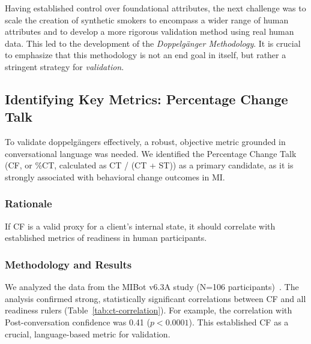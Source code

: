 Having established control over foundational attributes, the next challenge was to scale the creation of synthetic smokers to encompass a wider range of human attributes and to develop a more rigorous validation method using real human data. This led to the development of the \textit{Doppelgänger Methodology}. It is crucial to emphasize that this methodology is not an end goal in itself, but rather a stringent strategy for \textit{validation}.

\subsection{Identifying Key Metrics: Percentage Change Talk}

To validate doppelgängers effectively, a robust, objective metric grounded in conversational language was needed. We identified the Percentage Change Talk (CF, or \%CT, calculated as CT / (CT + ST)) as a primary candidate, as it is strongly associated with behavioral change outcomes in MI.

\subsubsection{Rationale}
If CF is a valid proxy for a client's internal state, it should correlate with established metrics of readiness in human participants.

\subsubsection{Methodology and Results}
We analyzed the data from the MIBot v6.3A study (N=106 participants)~\citep{mahmood-etal-2025-fully}. The analysis confirmed strong, statistically significant correlations between CF and all readiness rulers (Table~\ref{tab:ct-correlation}). For example, the correlation with Post-conversation confidence was 0.41 ($p < 0.0001$). This established CF as a crucial, language-based metric for validation.


